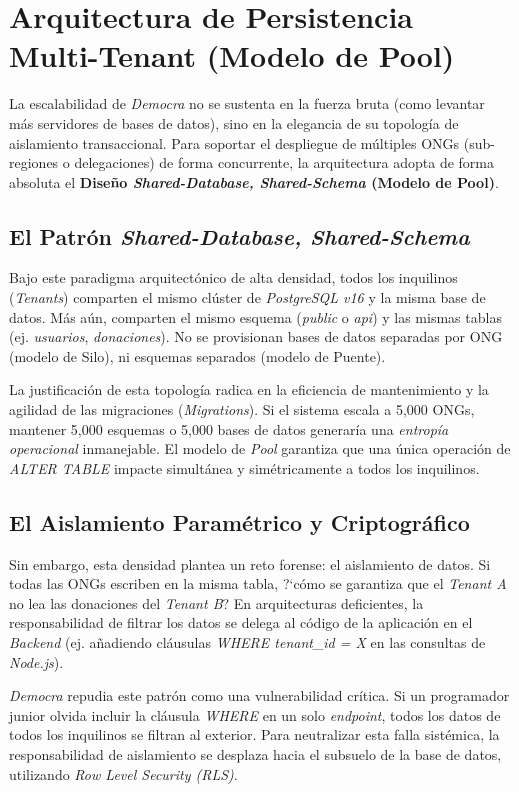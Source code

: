 \section{Arquitectura de Persistencia Multi-Tenant (Modelo de Pool)}

La escalabilidad de \textit{Democra} no se sustenta en la fuerza bruta (como levantar m\'as servidores de bases de datos), sino en la elegancia de su topolog\'ia de aislamiento transaccional. Para soportar el despliegue de m\'ultiples ONGs (sub-regiones o delegaciones) de forma concurrente, la arquitectura adopta de forma absoluta el \textbf{Dise\~no \textit{Shared-Database, Shared-Schema} (Modelo de Pool)}.

\subsection{El Patr\'on \textit{Shared-Database, Shared-Schema}}

Bajo este paradigma arquitect\'onico de alta densidad, todos los inquilinos (\textit{Tenants}) comparten el mismo cl\'uster de \textit{PostgreSQL v16} y la misma base de datos. M\'as a\'un, comparten el mismo esquema (\textit{public} o \textit{api}) y las mismas tablas (ej. \textit{usuarios}, \textit{donaciones}). No se provisionan bases de datos separadas por ONG (modelo de Silo), ni esquemas separados (modelo de Puente).

La justificaci\'on de esta topolog\'ia radica en la eficiencia de mantenimiento y la agilidad de las migraciones (\textit{Migrations}). Si el sistema escala a 5,000 ONGs, mantener 5,000 esquemas o 5,000 bases de datos generar\'ia una \textit{entrop\'ia operacional} inmanejable. El modelo de \textit{Pool} garantiza que una \'unica operaci\'on de \textit{ALTER TABLE} impacte simult\'anea y sim\'etricamente a todos los inquilinos.

\subsection{El Aislamiento Param\'etrico y Criptogr\'afico}

Sin embargo, esta densidad plantea un reto forense: el aislamiento de datos. Si todas las ONGs escriben en la misma tabla, ?`c\'omo se garantiza que el \textit{Tenant A} no lea las donaciones del \textit{Tenant B}? En arquitecturas deficientes, la responsabilidad de filtrar los datos se delega al c\'odigo de la aplicaci\'on en el \textit{Backend} (ej. a\~nadiendo cl\'ausulas \textit{WHERE tenant\_id = X} en las consultas de \textit{Node.js}).

\textit{Democra} repudia este patr\'on como una vulnerabilidad cr\'itica. Si un programador junior olvida incluir la cl\'ausula \textit{WHERE} en un solo \textit{endpoint}, todos los datos de todos los inquilinos se filtran al exterior. Para neutralizar esta falla sist\'emica, la responsabilidad de aislamiento se desplaza hacia el subsuelo de la base de datos, utilizando \textit{Row Level Security (RLS)}.
